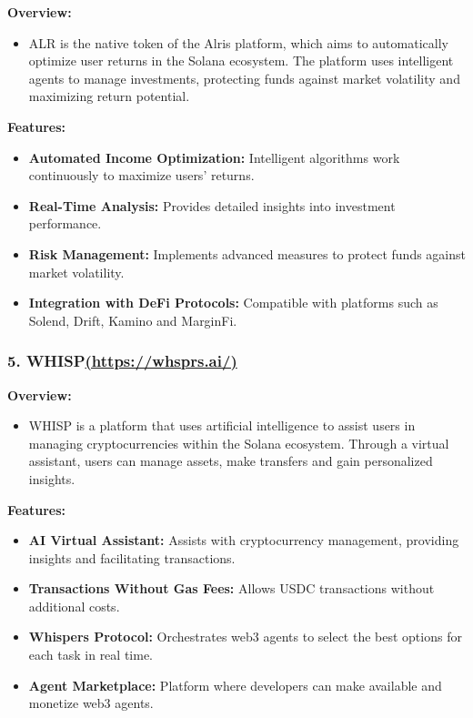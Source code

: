 \documentclass[
]{article}
\providecommand{\tightlist}{%
  \setlength{\itemsep}{0pt}\setlength{\parskip}{0pt}}
\begin{document}
\textbf{Overview:}

\begin{itemize}
\tightlist
\item
  ALR is the native token of the Alris platform, which aims to
  automatically optimize user returns in the Solana ecosystem. The
  platform uses intelligent agents to manage investments, protecting
  funds against market volatility and maximizing return potential.
\end{itemize}

\textbf{Features:}

\begin{itemize}
\tightlist
\item
  \textbf{Automated Income Optimization:} Intelligent algorithms work
  continuously to maximize users' returns.
\item
  \textbf{Real-Time Analysis:} Provides detailed insights into
  investment performance.
\item
  \textbf{Risk Management:} Implements advanced measures to protect
  funds against market volatility.
\item
  \textbf{Integration with DeFi Protocols:} Compatible with platforms
  such as Solend, Drift, Kamino and MarginFi.
\end{itemize}

\hypertarget{whisphttpswhsprs.ai}{%
\subsubsection{\texorpdfstring{5.
WHISP\href{https://whsprs.ai/}{(https://whsprs.ai/)}}{5. WHISP(https://whsprs.ai/)}}\label{whisphttpswhsprs.ai}}

\textbf{Overview:}

\begin{itemize}
\tightlist
\item
  WHISP is a platform that uses artificial intelligence to assist users
  in managing cryptocurrencies within the Solana ecosystem. Through a
  virtual assistant, users can manage assets, make transfers and gain
  personalized insights.
\end{itemize}

\textbf{Features:}

\begin{itemize}
\tightlist
\item
  \textbf{AI Virtual Assistant:} Assists with cryptocurrency management,
  providing insights and facilitating transactions.
\item
  \textbf{Transactions Without Gas Fees:} Allows USDC transactions
  without additional costs.
\item
  \textbf{Whispers Protocol:} Orchestrates web3 agents to select the
  best options for each task in real time.
\item
  \textbf{Agent Marketplace:} Platform where developers can make
  available and monetize web3 agents.
\end{itemize}
\end{document}
